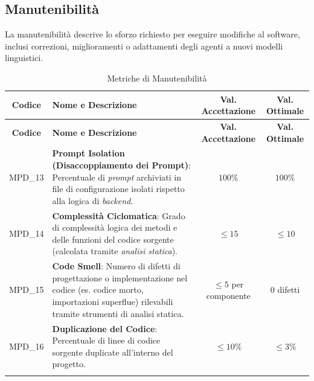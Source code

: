 \documentclass[12pt, a4paper]{article}
\newlength{\LargColVal} %
\begin{document}
\subsection{Manutenibilità}
La manutenibilità descrive lo sforzo richiesto per eseguire modifiche al software, inclusi correzioni, miglioramenti o adattamenti degli agenti a nuovi modelli linguistici.

\renewcommand{\arraystretch}{1.3}
\begin{xltabular}{\textwidth}{|c|X|C{\LargColVal}|C{\LargColVal}|}

    \hline
    \textbf{Codice} & \textbf{Nome e Descrizione} & \textbf{Val. Accettazione} & \textbf{Val. Ottimale} \\ \hline
    \endfirsthead

    \hline
    \textbf{Codice} & \textbf{Nome e Descrizione} & \textbf{Val. Accettazione} & \textbf{Val. Ottimale} \\ \hline
    \endhead

    MPD\_13 & \textbf{Prompt Isolation (Disaccoppiamento dei Prompt)}: Percentuale di \textit{prompt} archiviati in file di configurazione isolati rispetto alla logica di \textit{backend}. & $100\%$ & $100\%$ \\ \hline
    MPD\_14 & \textbf{Complessità Ciclomatica}: Grado di complessità logica dei metodi e delle funzioni del codice sorgente (calcolata tramite \textit{analisi statica}). & $\le 15$ & $\le 10$ \\ \hline
    MPD\_15 & \textbf{Code Smell}: Numero di difetti di progettazione o implementazione nel codice (es. codice morto, importazioni superflue) rilevabili tramite strumenti di analisi statica. & $\le 5$ per componente & $0$ difetti \\ \hline
    MPD\_16 & \textbf{Duplicazione del Codice}: Percentuale di linee di codice sorgente duplicate all'interno del progetto. & $\le 10\%$ & $\le 3\%$ \\ \hline

    \caption{Metriche di Manutenibilità}
    \label{tab:prod_manutenibilita}
\end{xltabular}
\end{document}
